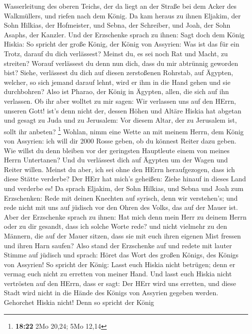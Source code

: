 Wasserleitung des oberen Teichs, der da liegt an der Straße bei dem
Acker des Walkmüllers,  und riefen nach dem König. Da kam
heraus zu ihnen Eljakim, der Sohn Hilkias, der Hofmeister, und Sebna,
der Schreiber, und Joah, der Sohn Asaphs, der Kanzler.  Und
der Erzschenke sprach zu ihnen: Sagt doch dem König Hiskia: So spricht
der große König, der König von Assyrien: Was ist das für ein Trotz,
darauf du dich verlässest?  Meinst du, es sei noch Rat und
Macht, zu streiten? Worauf verlässest du denn nun dich, dass du mir
abtrünnig geworden bist?  Siehe, verlässest du dich auf
diesen zerstoßenen Rohrstab, auf Ägypten, welcher, so sich jemand darauf
lehnt, wird er ihm in die Hand gehen und sie durchbohren? Also ist
Pharao, der König in Ägypten, allen, die sich auf ihn verlassen.
 Ob ihr aber wolltet zu mir sagen: Wir verlassen uns auf
den HErrn, unseren Gott! ist's denn nicht der, dessen Höhen und Altäre
Hiskia hat abgetan und gesagt zu Juda und zu Jerusalem: Vor diesem
Altar, der zu Jerusalem ist, sollt ihr anbeten? \footnote{\textbf{18:22}
  2Mo 20,24; 5Mo 12,14}  Wohlan, nimm eine Wette an mit
meinem Herrn, dem König von Assyrien: ich will dir 2000 Rosse geben, ob
du könnest Reiter dazu geben.  Wie willst du denn bleiben
vor der geringsten Hauptleute einem von meines Herrn Untertanen? Und du
verlässest dich auf Ägypten um der Wagen und Reiter willen.
 Meinst du aber, ich sei ohne den HErrn heraufgezogen, dass
ich diese Stätte verderbe? Der HErr hat mich's geheißen: Ziehe hinauf in
dieses Land und verderbe es!  Da sprach Eljakim, der Sohn
Hilkias, und Sebna und Joah zum Erzschenken: Rede mit deinen Knechten
auf syrisch, denn wir verstehen's; und rede nicht mit uns auf jüdisch
vor den Ohren des Volks, das auf der Mauer ist.  Aber der
Erzschenke sprach zu ihnen: Hat mich denn mein Herr zu deinem Herrn oder
zu dir gesandt, dass ich solche Worte rede? und nicht vielmehr zu den
Männern, die auf der Mauer sitzen, dass sie mit euch ihren eigenen Mist
fressen und ihren Harn saufen?  Also stand der Erzschenke
auf und redete mit lauter Stimme auf jüdisch und sprach: Höret das Wort
des großen Königs, des Königs von Assyrien!  So spricht der
König: Lasst euch Hiskia nicht betrügen; denn er vermag euch nicht zu
erretten von meiner Hand.  Und lasst euch Hiskia nicht
vertrösten auf den HErrn, dass er sagt: Der HErr wird uns erretten, und
diese Stadt wird nicht in die Hände des Königs von Assyrien gegeben
werden.  Gehorchet Hiskia nicht! Denn so spricht der König
